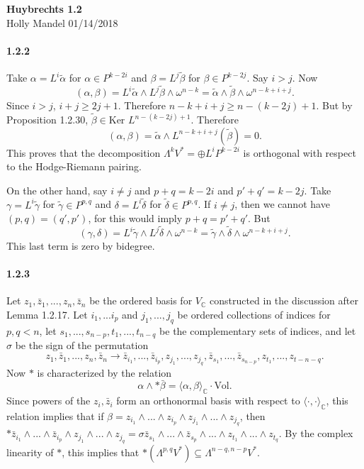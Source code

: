 \documentclass[10pt,letter]{article}
\begin{document}
\begin{center} 
{\bf Huybrechts 1.2} \\
Holly Mandel 01/14/2018
\end{center}

\paragraph*{1.2.2} Take $\alpha = L^i \tilde{\alpha}$ for $\alpha \in P^{k-2i}$ and $\beta = L^j \tilde{\beta}$ for $\beta \in P^{k-2j}$. Say $i > j$. Now
\[ (\alpha,\beta) =  L^i \tilde{\alpha} \wedge L^j \tilde{\beta} \wedge \omega^{n-k} = \tilde{\alpha} \wedge \tilde{\beta} \wedge \omega^{n-k+i+j}.\]
Since $i > j$, $i + j \geq 2j + 1$. Therefore $n-k+i+j \geq n-(k-2j)+1$. But by Proposition 1.2.30, $\tilde{\beta} \in \text{Ker }L^{n-(k-2j)+1}$. Therefore 
\[ (\alpha,\beta) = \tilde{\alpha} \wedge L^{n-k+i+j}(\tilde{\beta}) = 0.\] This proves that the decomposition $\Lambda^k V^{\ast} = \oplus L^i P^{k-2i}$ is orthogonal with respect to the Hodge-Riemann pairing.

On the other hand, say $i \neq j$ and $p+q = k- 2i$ and $p' +q' = k-2j$. Take $\gamma = L^i \tilde{\gamma}$ for $\tilde{\gamma} \in P^{p,q}$ and $\delta = L^i \tilde{\delta}$ for $\tilde{\delta} \in P^{p,q}$. If $i \neq j$, then we cannot have $(p,q) = (q',p')$, for this would imply $p+q = p'+q'$. But 
\[ (\gamma,\delta) = L^i\tilde{\gamma} \wedge L^j \tilde{\delta} \wedge \omega^{n-k} = \tilde{\gamma} \wedge \tilde{\delta} \wedge \omega^{n-k+i+j}.\]
This last term is zero by bidegree. 

\paragraph*{1.2.3} Let $z_1,\bar{z}_1,...,z_n,\bar{z}_n$ be the ordered basis for $V_{\mathbb{C}}$ constructed in the discussion after Lemma 1.2.17. Let $i_1,...i_p$ and $j_1,...,j_q$ be ordered collections of indices for $p,q < n$, let $s_1,...,s_{n-p},t_1,...,t_{n-q}$ be the complementary sets of indices, and let $\sigma$ be the sign of the permutation
\[ z_1,\bar{z}_1,...,z_n,\bar{z}_n \rightarrow \bar{z}_{i_1},...,\bar{z}_{i_p},z_{j_1},...,z_{j_q},\bar{z}_{s_1},  ...  , \bar{z}_{s_{n-p}} , z_{t_1} , ... ,z_{t-{n-q}}.\]  Now $\ast$ is characterized by the relation \[ \alpha \wedge \ast \bar{\beta} = \langle \alpha, \beta \rangle_{\mathbb{C}} \cdot \text{Vol}. \] 
Since powers of the $z_i, \bar{z}_i$ form an orthonormal basis with respect to $\langle \cdot , \cdot \rangle_{\mathbb{C}}$, this relation implies that if $\beta = z_{i_1} \wedge ... \wedge z_{i_p} \wedge z_{j_1} \wedge ... \wedge z_{j_q}$, then $\ast \bar{z}_{i_1} \wedge ... \wedge \bar{z}_{i_p} \wedge z_{j_1} \wedge ... \wedge z_{j_q} = \sigma \bar{z}_{s_1} \wedge ... \wedge \bar{z}_{s_p} \wedge ... \wedge z_{t_1} \wedge ... \wedge z_{t_q}.$ By the complex linearity of $\ast$, this implies that $\ast(\Lambda^{p,q}V^{\ast}) \subseteq \Lambda^{n-q,n-p}V^{\ast}$. 
\end{document}
